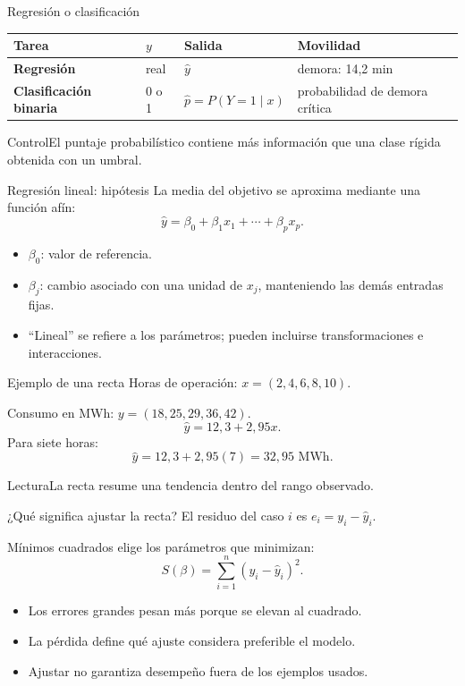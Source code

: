 \documentclass[aspectratio=169,10pt]{beamer}
\begin{document}
\begin{frame}{Regresión o clasificación}
  \small
  \begin{tabularx}{\textwidth}{>{\bfseries}p{}p{}p{}X}\toprule
  Tarea & $y$ & Salida & Movilidad\\\midrule
  Regresión & real & $\widehat y$ & demora: 14,2 min\\
  Clasificación binaria & 0 o 1 & $\widehat p=P(Y=1\mid x)$ & probabilidad de demora crítica\\\bottomrule
  \end{tabularx}
  \begin{block}{Control}El puntaje probabilístico contiene más información que una clase rígida obtenida con un umbral.\end{block}
\end{frame}

\begin{frame}{Regresión lineal: hipótesis}
  \small
  La media del objetivo se aproxima mediante una función afín:
  \[\widehat y=\beta_0+\beta_1x_1+\cdots+\beta_px_p.\]
  \begin{itemize}
    \item $\beta_0$: valor de referencia.
    \item $\beta_j$: cambio asociado con una unidad de $x_j$, manteniendo las demás entradas fijas.
    \item “Lineal” se refiere a los parámetros; pueden incluirse transformaciones e interacciones.
  \end{itemize}
\end{frame}

\begin{frame}{Ejemplo de una recta}
  \small
  Horas de operación: $x=(2,4,6,8,10)$.

  Consumo en MWh: $y=(18,25,29,36,42)$.
  \[\widehat y=12{,}3+2{,}95x.\]
  Para siete horas:
  \[\widehat y=12{,}3+2{,}95(7)=32{,}95\text{ MWh}.\]
  \begin{block}{Lectura}La recta resume una tendencia dentro del rango observado.\end{block}
\end{frame}

\begin{frame}{¿Qué significa ajustar la recta?}
  \small
  El residuo del caso $i$ es $e_i=y_i-\widehat y_i$.

  Mínimos cuadrados elige los parámetros que minimizan:
  \[S(\beta)=\sum_{i=1}^{n}(y_i-\widehat y_i)^2.\]
  \begin{itemize}
    \item Los errores grandes pesan más porque se elevan al cuadrado.
    \item La pérdida define qué ajuste considera preferible el modelo.
    \item Ajustar no garantiza desempeño fuera de los ejemplos usados.
  \end{itemize}
\end{frame}
\end{document}
